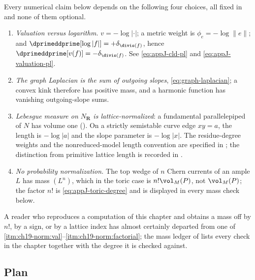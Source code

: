 Every numerical claim below depends on the following four choices, all fixed
in  and none of them optional.

\begin{enumerate}
\item\label{itm:ch19-norm:val} \emph{Valuation versus logarithm.}
$v=-\log|\cdot|$; a metric weight is $\phi_e=-\log\|e\|$; and
$\dprimeddprime[\log|f|]=+\delta_{\divis(f)}$, hence
$\dprimeddprime[v(f)]=-\delta_{\divis(f)}$.  See
\eqref{eq:appJ-cld-pl} and \eqref{eq:appJ-valuation-pl}.
\item\label{itm:ch19-norm:lap} \emph{The graph Laplacian is the sum of
outgoing slopes}, \eqref{eq:graph-laplacian}; a convex kink therefore has
positive mass, and a harmonic function has vanishing outgoing-slope sums.
\item\label{itm:ch19-norm:lattice} \emph{Lebesgue measure on
$N_{\mathbf R}$ is lattice-normalized}: a fundamental parallelepiped
of $N$ has volume one ().
On a strictly semistable curve edge $xy=a$, the length is
$-\log|a|$ and the slope parameter is $-\log|x|$.
The residue-degree weights and the nonreduced-model length convention
are specified in ; the distinction
from primitive lattice length is recorded in .
\item\label{itm:ch19-norm:factorial} \emph{No probability normalization.}
The top wedge of $n$ Chern currents of an ample $L$ has mass $(L^n)$,
which in the toric case is $n!\vol_M(P)$, not $\vol_M(P)$; the factor
$n!$ is \eqref{eq:appJ-toric-degree} and is displayed in every mass check
below.
\end{enumerate}

A reader who reproduces a computation of this chapter and obtains a mass off
by $n!$, by a sign, or by a lattice index has almost certainly departed
from one of \,\cref{itm:ch19-norm:val}--\cref{itm:ch19-norm:factorial}; the
mass ledger of  lists every check in the chapter
together with the degree it is checked against.

\subsection{Plan}
\label{sec:ch19-plan}

